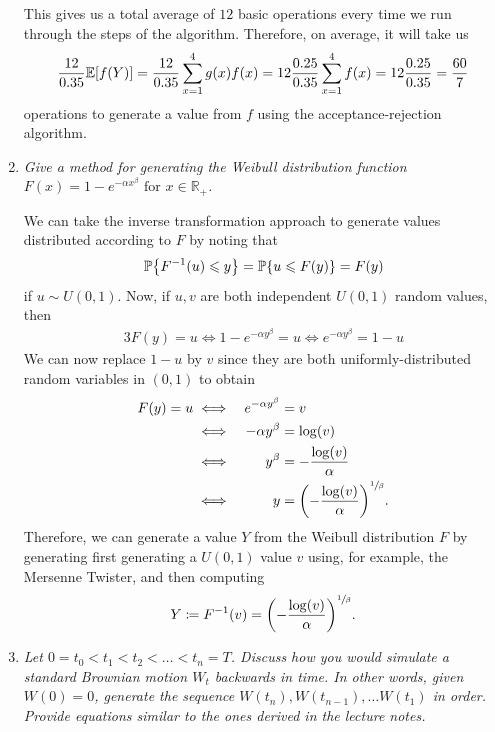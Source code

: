 \documentclass{article}
\renewcommand{\leq}{\leqslant}
\newcommand{\defn}{\coloneqq}
\newcommand{\E}[1]{\mathbb{E}\sqparens*{#1}}
\DeclarePairedDelimiter \set{\lbrace}{\rbrace}
\DeclarePairedDelimiter \parens{(}{)}
\DeclarePairedDelimiter \sqparens{[}{]}
\begin{document}
\begin{enumerate}
        This gives us a total average of $12$ basic operations every time we run through the steps of the algorithm.
        Therefore, on average, it will take us
        \begin{equation*}
            \frac{12}{0.35}\E{f(Y)} = \frac{12}{0.35}\sum_{x = 1}^{4}g(x)f(x) = 12\frac{0.25}{0.35}\sum_{x = 1}^{4}f(x) = 12\frac{0.25}{0.35} = \frac{60}{7}
        \end{equation*}
        operations to generate a value from $f$ using the acceptance-rejection algorithm.
    \newpage
    \item \label{2}
        {\it Give a method for generating the Weibull distribution function $F(x) = 1 - e^{-\alpha x^\beta} \text{ for } x \in \mathbb{R}_+$.}

        We can take the inverse transformation approach to generate values distributed according to $F$ by noting that
        \begin{equation*}
            \mathbb{P}\set*{F^{-1}(u) \leq y} = \mathbb{P}\set*{u \leq F(y)} = F(y)
        \end{equation*}
        if $u \sim U(0, 1)$.
        Now, if $u, v$ are both independent $U(0, 1)$ random values, then
        \begin{alignat*}{3}
            F(y) = u
            \iff 1 - e^{-\alpha y^\beta}  = u
            \iff e^{-\alpha y^\beta}      = 1 - u
        \end{alignat*}
        We can now replace $1 - u$ by $v$ since they are both uniformly-distributed random variables in $(0, 1)$ to obtain
        \begin{alignat*}{3}
            F(y) = u
            &\iff& e^{-\alpha y^\beta}      &= v\\
            &\iff& -\alpha y^\beta          &= \log(v)\\
            &\iff& y^\beta                  &= -\frac{\log(v)}{\alpha}\\
            &\iff& y                        &= \parens*{-\frac{\log(v)}{\alpha}}^{\sfrac 1 \beta}.
        \end{alignat*}
        Therefore, we can generate a value $Y$ from the Weibull distribution $F$ by generating first generating a $U(0, 1)$ value $v$ using, for example, the Mersenne Twister,
        and then computing
        \begin{equation*}
            Y \defn F^{-1}(v) = \parens*{-\frac{\log(v)}{\alpha}}^{\sfrac 1 \beta}.
        \end{equation*}
    \item \label{3}
        {\it Let $0 = t_0 < t_1 < t_2 < \dots < t_n = T$. Discuss how you would simulate a standard Brownian motion $W_t$ backwards in time.
        In other words, given $W(0) = 0$, generate the sequence $W(t_n), W(t_{n-1}), \dots W(t_1)$ in order.
        Provide equations similar to the ones derived in the lecture notes.}


\end{enumerate}
\end{document}
